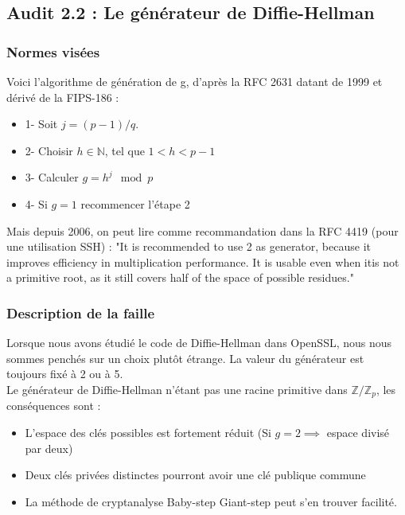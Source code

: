 	\subsection{Audit 2.2 : Le générateur de Diffie-Hellman}
		\subsubsection{\label{audit2.2}Normes visées}

		Voici l'algorithme de génération de g, d'après la RFC 2631 \cite{rfc2631} datant de 1999 et dérivé de la FIPS-186 : 
		\begin{itemize}
		\item 1- Soit $j = (p - 1)/q$.
		\item 2- Choisir $h \in \mathbb{N}$, tel que $1 < h < p - 1$
		\item 3- Calculer $g = h^j \mod p$
		\item 4- Si $g = 1$ recommencer l'étape 2\\
		\end{itemize}
	
		Mais depuis 2006, on peut lire comme recommandation dans la RFC 4419 (pour une utilisation SSH) : "It is recommended to use 2 as generator, because it improves	efficiency in multiplication performance.  It is usable even when itis not a primitive root, as it still covers half of the space of possible residues."\\
	
		\subsubsection{Description de la faille}
	
		Lorsque nous avons étudié le code de Diffie-Hellman dans OpenSSL, nous nous	sommes penchés sur un choix plutôt étrange. La valeur du générateur est toujours fixé à 2 ou à 5. \\
	
		Le générateur de Diffie-Hellman n'étant pas une racine primitive dans $\mathbb{Z}/\mathbb{Z}_p$, les conséquences sont :
		\begin{itemize}
		\item L'espace des clés possibles est fortement réduit (Si $g=2 \implies$ espace divisé par deux)
		\item Deux clés privées distinctes pourront avoir une clé publique commune
		\item La méthode de cryptanalyse Baby-step Giant-step peut s'en trouver 
		facilité.\\
		\end{itemize}
	
